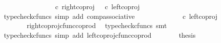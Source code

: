 \begin{isabellebody}
\ \ \ \ \ \ \ \ \ \ {\isacharparenleft}{\kern0pt}{\isasymlangle}{\isasymt}{\isacharcomma}{\kern0pt}{\isasymt}{\isasymrangle}\ {\isasymamalg}\ {\isasymlangle}{\isasymf}{\isacharcomma}{\kern0pt}\ {\isasymf}{\isasymrangle}\ {\isasymamalg}\ {\isasymlangle}{\isasymf}{\isacharcomma}{\kern0pt}{\isasymt}{\isasymrangle}\ {\isasymcirc}\isactrlsub c\ right{\isacharunderscore}{\kern0pt}coproj\ {\isasymone}\ {\isacharparenleft}{\kern0pt}{\isasymone}{\isasymCoprod}{\isasymone}{\isacharparenright}{\kern0pt}\ {\isacharparenright}{\kern0pt}{\isasymcirc}\isactrlsub c\ left{\isacharunderscore}{\kern0pt}coproj\ {\isasymone}\ {\isasymone}{\isachardoublequoteclose}\isanewline
\ \ \ \ \ \ \isamarkupfalse%
\ {\isacharparenleft}{\kern0pt}typecheck{\isacharunderscore}{\kern0pt}cfuncs{\isacharcomma}{\kern0pt}\ simp\ add{\isacharcolon}{\kern0pt}\ comp{\isacharunderscore}{\kern0pt}associative{}{\isacharparenright}{\kern0pt}\isanewline
\ \ \ \ \isamarkupfalse%
\ \isamarkupfalse%
\ {\isachardoublequoteopen}{\isachardot}{\kern0pt}{\isachardot}{\kern0pt}{\isachardot}{\kern0pt}\ {\isacharequal}{\kern0pt}\ {\isasymlangle}{\isasymf}{\isacharcomma}{\kern0pt}\ {\isasymf}{\isasymrangle}\ {\isasymamalg}\ {\isasymlangle}{\isasymf}{\isacharcomma}{\kern0pt}{\isasymt}{\isasymrangle}\ {\isasymcirc}\isactrlsub c\ left{\isacharunderscore}{\kern0pt}coproj\ {\isasymone}\ {\isasymone}{\isachardoublequoteclose}\isanewline
\ \ \ \ \ \ \isamarkupfalse%
\ right{\isacharunderscore}{\kern0pt}coproj{\isacharunderscore}{\kern0pt}cfunc{\isacharunderscore}{\kern0pt}coprod\ \isamarkupfalse%
\ {\isacharparenleft}{\kern0pt}typecheck{\isacharunderscore}{\kern0pt}cfuncs{\isacharcomma}{\kern0pt}\ smt{\isacharparenright}{\kern0pt}\isanewline
\ \ \ \ \isamarkupfalse%
\ \isamarkupfalse%
\ {\isachardoublequoteopen}{\isachardot}{\kern0pt}{\isachardot}{\kern0pt}{\isachardot}{\kern0pt}\ {\isacharequal}{\kern0pt}\ {\isasymlangle}{\isasymf}{\isacharcomma}{\kern0pt}\ {\isasymf}{\isasymrangle}{\isachardoublequoteclose}\isanewline
\ \ \ \ \ \ \isamarkupfalse%
\ {\isacharparenleft}{\kern0pt}typecheck{\isacharunderscore}{\kern0pt}cfuncs{\isacharcomma}{\kern0pt}\ simp\ add{\isacharcolon}{\kern0pt}\ left{\isacharunderscore}{\kern0pt}coproj{\isacharunderscore}{\kern0pt}cfunc{\isacharunderscore}{\kern0pt}coprod{\isacharparenright}{\kern0pt}\isanewline
\ \ \ \ \isamarkupfalse%
\ \isamarkupfalse%
\ {\isacharquery}{\kern0pt}thesis\isacommand{{\isachardot}{\kern0pt}}\isamarkupfalse%

\end{isabellebody}
